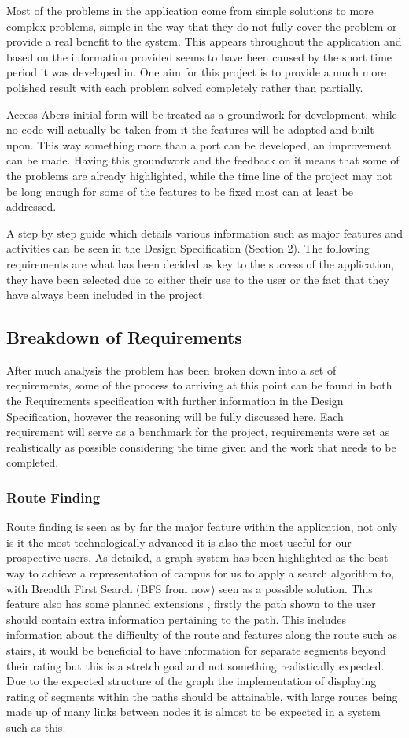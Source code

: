 Most of the problems in the application come from simple solutions to more complex problems, simple in the way that they do not fully cover the problem or provide a real benefit to the system. This appears throughout the application and based on the information provided seems to have been caused by the short time period it was developed in. One aim for this project is to provide a much more polished result with each problem solved completely rather than partially. 

Access Abers initial form will be treated as a groundwork for development, while no code will actually be taken from it the features will be adapted and built upon. This way something more than a port can be developed, an improvement can be made. Having this groundwork and the feedback on it means that some of the problems are already highlighted, while the time line of the project may not be long enough for some of the features to be fixed most can at least be addressed. 

A step by step guide which details various information such as major features and activities can be seen in the Design Specification (Section 2). The following requirements are what has been decided as key to the success of the application, they have been selected due to either their use to the user or the fact that they have always been included in the project.
\subsection{Breakdown of Requirements}
After much analysis the problem has been broken down into a set of requirements, some of the process to arriving at this point can be found in both the Requirements specification with further information in the Design Specification, however the reasoning will be fully discussed here. Each requirement will serve as a benchmark for the project, requirements were set as realistically as possible considering the time given and the work that needs to be completed. 
\subsubsection{Route Finding}
Route finding is seen as by far the major feature within the application, not only is it the most technologically advanced it is also the most useful for our prospective users. As detailed, a graph system has been highlighted as the best way to achieve a representation of campus for us to apply a search algorithm to, with Breadth First Search (BFS from now)\cite{bfs} seen as a possible solution. This feature also has some planned extensions , firstly the path shown to the user should contain extra information pertaining to the path. This includes information about the difficulty of the route and features along the route such as stairs, it would be beneficial to have information for separate segments beyond their rating but this is a stretch goal and not something realistically expected. Due to the expected structure of the graph the implementation of displaying rating of segments within the paths should be attainable, with large routes being made up of many links between nodes it is almost to be expected in a system such as this. 

